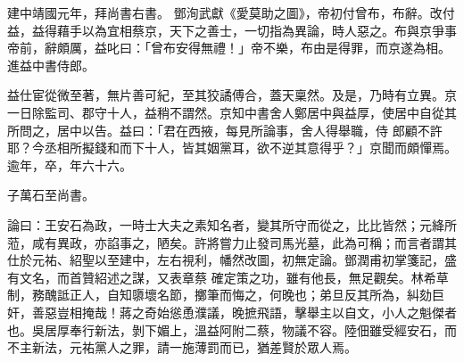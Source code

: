\begin{pinyinscope}
 建中靖國元年，拜尚書右書。
 鄧洵武獻《愛莫助之圖》，帝初付曾布，布辭。改付益，益得藉手以為宜相蔡京，天下之善士，一切指為異論，時人惡之。布與京爭事帝前，辭頗厲，益叱曰：「曾布安得無禮！」帝不樂，布由是得罪，而京遂為相。進益中書侍郎。



 益仕宦從微至著，無片善可紀，至其狡譎傅合，蓋天稟然。及是，乃時有立異。京一日除監司、郡守十人，益稍不謂然。京知中書舍人鄭居中與益厚，使居中自從其所問之，居中以告。益曰：「君在西掖，每見所論事，舍人得舉職，侍
 郎顧不許耶？今丞相所擬錢和而下十人，皆其姻黨耳，欲不逆其意得乎？」京聞而頗憚焉。逾年，卒，年六十六。



 子萬石至尚書。



 論曰：王安石為政，一時士大夫之素知名者，變其所守而從之，比比皆然；元絳所蒞，咸有異政，亦諂事之，陋矣。許將嘗力止發司馬光墓，此為可稱；而言者謂其仕於元祐、紹聖以至建中，左右視利，幡然改圖，初無定論。鄧潤甫初掌箋記，盛有文名，而首贊紹述之謀，又表章蔡
 確定策之功，雖有他長，無足觀矣。林希草制，務醜詆正人，自知隳壞名節，擲筆而悔之，何晚也；弟旦反其所為，糾劾巨奸，善惡豈相掩哉！蔣之奇始慫恿濮議，晚摭飛語，擊舉主以自文，小人之魁傑者也。吳居厚奉行新法，剝下媚上，溫益阿附二蔡，物議不容。陸佃雖受經安石，而不主新法，元祐黨人之罪，請一施薄罰而已，猶差賢於眾人焉。



\end{pinyinscope}
